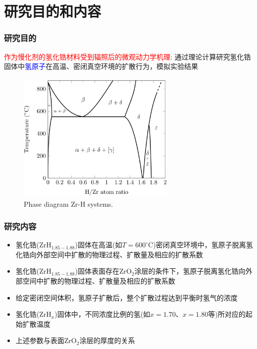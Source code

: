 \section{研究目的和内容}
\begin{frame}
	\frametitle{研究目的}
	\textcolor{red}{作为慢化剂的氢化锆材料受到辐照后的微观动力学机理}:
	\vskip 2pt
	通过理论计算研究氢化锆固体中\textcolor{blue}{氢原子}在高温、密闭真空环境的扩散行为，模拟实验结果
\begin{figure}[!ht]
\centering
\vspace*{-0.05in}
\includegraphics[height=2.50in,width=3.00in,viewport=0 0 930 748,clip]{Figures/Phase_diagram-Zr_H-systems.png}
\caption{\tiny \textrm{Phase diagram Zr-H systems.}}
\label{Fig:Phase_diagram-Zr_H-systems}
\end{figure}
\end{frame}

\begin{frame}
	\frametitle{研究内容}
	\begin{itemize}
	\item 氢化锆($\mathrm{ZrH}_{1.85-1.88}$)固体在高温(如$T=600^{\circ}\mathrm{C}$)密闭真空环境中，氢原子脱离氢化锆向外部空间中扩散的物理过程、扩散量及相应的扩散系数
	\item 氢化锆($\mathrm{ZrH}_{1.85-1.88}$)固体表面存在$\mathrm{ZrO}_2$涂层的条件下，氢原子脱离氢化锆向外部空间中扩散的物理过程、扩散量及相应的扩散系数
	\item 给定密闭空间体积，氢原子扩散后，整个扩散过程达到平衡时氢气的浓度
	\item 氢化锆($\mathrm{ZrH}_x$)固体中，不同浓度比例的氢(如$x=1.70$、$x=1.80$等)所对应的起始扩散温度
	\item 上述参数与表面$\mathrm{ZrO}_2$涂层的厚度的关系
	\end{itemize}
\end{frame}

